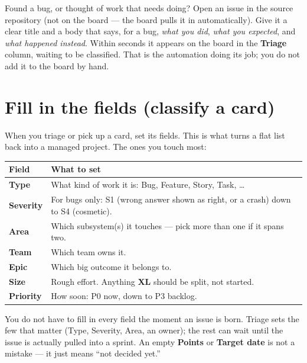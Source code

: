 \documentclass[11pt,a4paper]{report}
\newcommand{\fieldname}[1]{\textbf{#1}}
\begin{document}
Found a bug, or thought of work that needs doing? Open an issue in the source
repository (not on the board --- the board pulls it in automatically). Give it a
clear title and a body that says, for a bug, \emph{what you did}, \emph{what you
expected}, and \emph{what happened instead}. Within seconds it appears on the board
in the \textbf{Triage} column, waiting to be classified. That is the automation
doing its job; you do not add it to the board by hand.

\section{Fill in the fields (classify a card)}

When you triage or pick up a card, set its fields. This is what turns a flat list
back into a managed project. The ones you touch most:

\begin{center}
\begin{tabular}{@{}p{2.6cm}p{11cm}@{}}
\toprule
\textbf{Field} & \textbf{What to set} \\
\midrule
\fieldname{Type} & What kind of work it is: Bug, Feature, Story, Task, \ldots \\
\fieldname{Severity} & For bugs only: S1 (wrong answer shown as right, or a crash) down to S4 (cosmetic). \\
\fieldname{Area} & Which subsystem(s) it touches --- pick more than one if it spans two. \\
\fieldname{Team} & Which team owns it. \\
\fieldname{Epic} & Which big outcome it belongs to. \\
\fieldname{Size} & Rough effort. Anything \textbf{XL} should be split, not started. \\
\fieldname{Priority} & How soon: P0 now, down to P3 backlog. \\
\bottomrule
\end{tabular}
\end{center}

\begin{plainenglish}
You do not have to fill in every field the moment an issue is born. Triage sets the
few that matter (Type, Severity, Area, an owner); the rest can wait until the issue
is actually pulled into a sprint. An empty \fieldname{Points} or \fieldname{Target
date} is not a mistake --- it just means ``not decided yet.''
\end{plainenglish}
\end{document}

